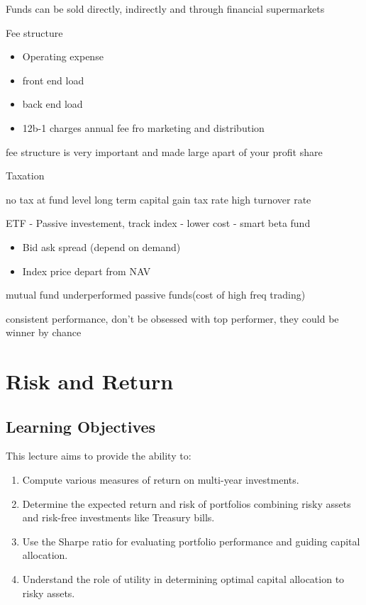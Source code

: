 \documentclass[
]{book}
\providecommand{\tightlist}{%
  \setlength{\itemsep}{0pt}\setlength{\parskip}{0pt}}
\begin{document}
Funds can be sold directly, indirectly and through financial supermarkets

Fee structure

\begin{itemize}
\tightlist
\item
  Operating expense
\item
  front end load
\item
  back end load
\item
  12b-1 charges annual fee fro marketing and distribution
\end{itemize}

fee structure is very important and made large apart of your profit share

Taxation

no tax at fund level
long term capital gain tax rate
high turnover rate

ETF
- Passive investement, track index
- lower cost
- smart beta fund

\begin{itemize}
\tightlist
\item
  Bid ask spread (depend on demand)
\item
  Index price depart from NAV
\end{itemize}

mutual fund underperformed passive funds(cost of high freq trading)

consistent performance, don't be obsessed with top performer, they could be winner by chance

\hypertarget{ch2}{%
\chapter{Risk and Return}\label{ch2}}

\hypertarget{learning-objectives}{%
\section{Learning Objectives}\label{learning-objectives}}

This lecture aims to provide the ability to:

\begin{enumerate}
\def\labelenumi{\arabic{enumi}.}
\tightlist
\item
  Compute various measures of return on multi-year investments.
\item
  Determine the expected return and risk of portfolios combining risky assets and risk-free investments like Treasury bills.
\item
  Use the Sharpe ratio for evaluating portfolio performance and guiding capital allocation.
\item
  Understand the role of utility in determining optimal capital allocation to risky assets.
\end{enumerate}
\end{document}
